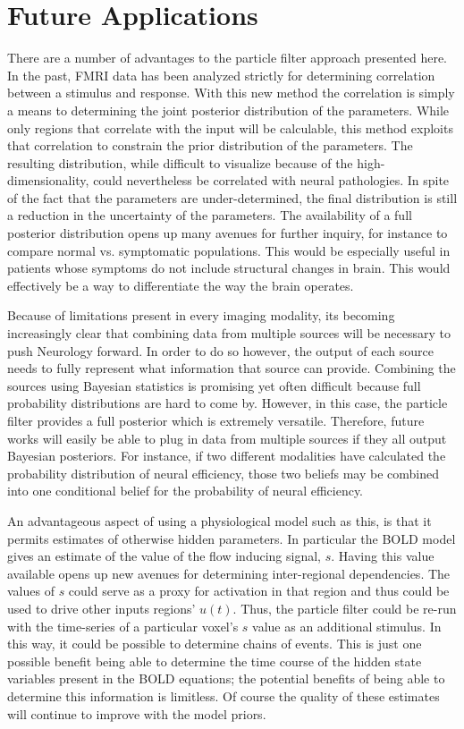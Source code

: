 \section{Future Applications}
There are a number of advantages to the particle filter approach presented
here. In the past, FMRI data has been analyzed strictly for determining
correlation between a stimulus and response. With this new method
the correlation is simply a means to determining the joint posterior distribution
of the parameters. While only regions that correlate with the input will 
be calculable, this method exploits that correlation to constrain the 
prior distribution of the parameters. The resulting distribution, while difficult 
to visualize because of the high-dimensionality, could nevertheless be 
correlated with neural pathologies. In spite of the fact that the parameters
are under-determined, the final distribution is still a reduction in the
uncertainty of the parameters. The availability of a full posterior distribution
opens up many avenues for further inquiry, for instance
to compare normal vs. symptomatic
populations. This would be especially useful in patients whose symptoms
do not include structural changes in brain. This would effectively be
a way to differentiate the way the brain operates. 

Because of limitations present in every imaging modality,
its becoming increasingly clear that combining data from multiple sources
will be necessary to push Neurology forward. In order to do so however, the
output of each source needs to fully represent what information that source
can provide. Combining the sources using Bayesian statistics is promising
yet often difficult because full probability distributions are hard to come by.
However, in this case, the particle filter provides a full posterior which
is extremely versatile. Therefore, future works will easily be able to
plug in data from multiple sources if they all output Bayesian posteriors.
For instance, if two different modalities have calculated the probability
distribution of neural efficiency, those two beliefs may be combined into
one conditional belief for the probability of neural efficiency. 

An advantageous aspect of using a physiological model such as this, is that
it permits estimates of otherwise hidden parameters. In particular the BOLD
model gives an estimate of the value of the flow inducing signal, $s$. Having
this value available opens up new avenues for determining inter-regional
dependencies. The values of $s$ could serve as a proxy for activation in 
that region and thus could be used to drive other inputs regions' $u(t)$. 
Thus, the particle filter could be re-run
with the time-series of a particular voxel's $s$ value as an additional stimulus.
In this way, it could be possible to determine chains of events. This is just
one possible benefit being able to determine the time course of the hidden
state variables present in the BOLD equations; the potential benefits of being
able to determine this information is limitless. Of course the quality of these
estimates will continue to improve with the model priors. 


